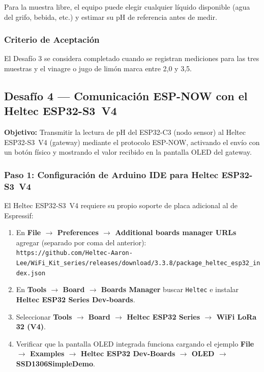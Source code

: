 \documentclass[12pt,leqno]{article}
\begin{document}
\noindent Para la muestra libre, el equipo puede elegir cualquier l\'iquido
disponible (agua del grifo, bebida, etc.) y estimar su pH de referencia antes de
medir.

\subsubsection*{Criterio de Aceptaci\'on}

El Desaf\'io 3 se considera completado cuando se registran mediciones para las tres
muestras y el vinagre o jugo de lim\'on marca entre 2,0 y 3,5.

\newpage
\subsection{Desaf\'io 4 --- Comunicaci\'on ESP-NOW con el Heltec ESP32-S3~V4}

\textbf{Objetivo:} Transmitir la lectura de pH del ESP32-C3 (nodo sensor) al
Heltec ESP32-S3~V4 (gateway) mediante el protocolo ESP-NOW, activando el env\'io
con un bot\'on f\'isico y mostrando el valor recibido en la pantalla OLED del
gateway.

\subsubsection*{Paso 1: Configuraci\'on de Arduino IDE para Heltec ESP32-S3~V4}

El Heltec ESP32-S3~V4 requiere su propio soporte de placa adicional al de Espressif:

\begin{enumerate}[(1)]
    \item En \textbf{File $\rightarrow$ Preferences $\rightarrow$ Additional boards
    manager URLs} agregar (separado por coma del anterior):\\
    \texttt{\small https://github.com/Heltec-Aaron-Lee/WiFi\_Kit\_series/releases/download/3.3.8/package\_heltec\_esp32\_index.json}
    \item En \textbf{Tools $\rightarrow$ Board $\rightarrow$ Boards Manager} buscar
    \texttt{Heltec} e instalar \textbf{Heltec ESP32 Series Dev-boards}.
    \item Seleccionar \textbf{Tools $\rightarrow$ Board $\rightarrow$ Heltec ESP32
    Series $\rightarrow$ WiFi LoRa 32 (V4)}.
    \item Verificar que la pantalla OLED integrada funciona cargando el ejemplo
    \textbf{File $\rightarrow$ Examples $\rightarrow$ Heltec ESP32 Dev-Boards
    $\rightarrow$ OLED $\rightarrow$ SSD1306SimpleDemo}.
\end{enumerate}
\end{document}
